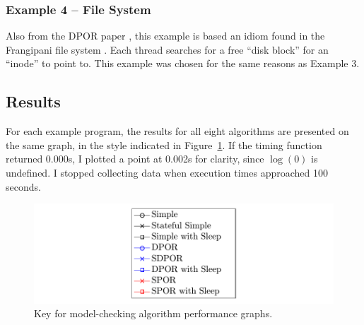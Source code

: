 \documentclass[12pt,a4paper,twoside,openright]{report}
\begin{document}
\subsubsection{Example 4 -- File System}
Also from the DPOR paper
\cite[Figure~7]{flan05}, this example is
based an idiom found in the Frangipani file
system \cite{thek97}.
Each thread searches for a free
``disk block'' for an ``inode'' to point
to. This example was chosen for
the same reasons as Example 3.

\subsection{Results}
For each example program, the results for all eight
algorithms are presented on the same graph, in the
style indicated in Figure~\ref{fig:key}.
If the timing function
returned 0.000s, I plotted a point at 0.002s
for clarity, since
$\log(0)$ is undefined.
I stopped collecting data when execution
times approached 100 seconds.

\begin{figure}
	\includegraphics[width=\textwidth]{key}
	\caption{Key for model-checking algorithm performance graphs.}
	\label{fig:key}
\end{figure}
\end{document}
